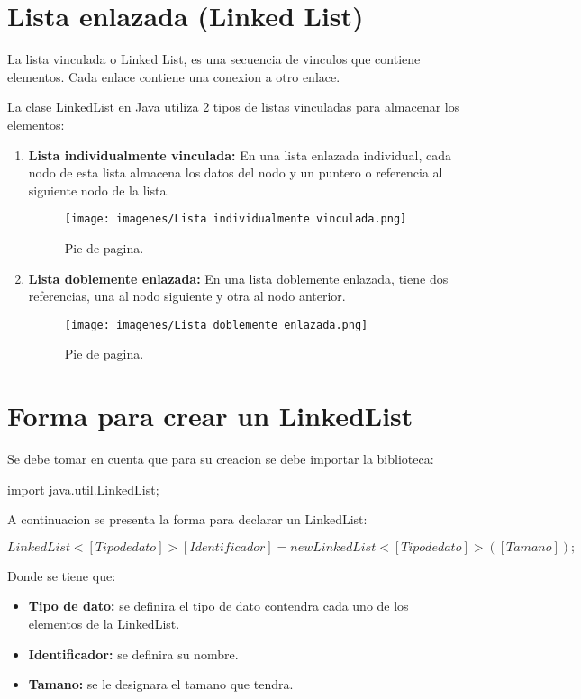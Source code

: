 \documentclass[12pt, letterpaper]{article} %
\begin{document}
\section{Lista enlazada (Linked List)}
La lista vinculada o Linked List, es una secuencia de vinculos que contiene elementos. Cada enlace contiene una conexion a otro enlace.

La clase LinkedList en Java utiliza 2 tipos de listas vinculadas para almacenar los elementos:
\begin{enumerate}
    \item \textbf{Lista individualmente vinculada:} En una lista enlazada individual, cada nodo de esta lista almacena los datos del nodo y un puntero o referencia al siguiente nodo de la lista.
    \begin{figure}[h]
        \centering
        \texttt{[image: imagenes/Lista individualmente vinculada.png]}
        \caption{Pie de pagina.}
        \label{fig:individual}
    \end{figure}

    \item \textbf{Lista doblemente enlazada:} En una lista doblemente enlazada, tiene dos referencias, una al nodo siguiente y otra al nodo anterior.
    \begin{figure}[h]
        \centering
        \texttt{[image: imagenes/Lista doblemente enlazada.png]}
        \caption{Pie de pagina.}
        \label{fig:doblemente}
    \end{figure}

\end{enumerate}

\section*{Forma para crear un LinkedList}
Se debe tomar en cuenta que para su creacion se debe importar la biblioteca:

\begin{center}
    import java.util.LinkedList;
\end{center}
A continuacion se presenta la forma para declarar un LinkedList:

\begin{center}
    $LinkedList<[Tipo de dato]> [Identificador] = new LinkedList<[Tipo de dato]>([Tamano]);$
\end{center}
Donde se tiene que:
\begin{itemize}
    \item \textbf{Tipo de dato:} se definira el tipo de dato contendra cada uno de los elementos de la LinkedList.
    \item \textbf{Identificador:} se definira su nombre.
    \item \textbf{Tamano:} se le designara el tamano que tendra.
\end{itemize}
\end{document}
